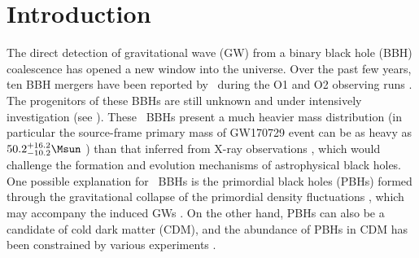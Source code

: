 \documentclass[twocolumn]{aastex631}
\begin{document}

\section{Introduction}
The direct detection of gravitational wave (GW) from a binary black hole (BBH)
coalescence \cite{Abbott:2016blz} has opened a new window into the universe.
Over the past few years, ten BBH mergers have been reported by \lvc\ during 
the O1 and O2 observing runs \cite{Abbott:2016blz,Abbott:2016nmj,%
TheLIGOScientific:2016pea,Abbott:2017vtc,%
Abbott:2017gyy,Abbott:2017oio,LIGOScientific:2018mvr}.
The progenitors of these BBHs are still unknown and under intensively investigation (see \eg \cite{Bird:2016dcv,Sasaki:2016jop,Chen:2018czv,%
Fishbach:2017dwv,Clesse:2016vqa,Antonini:2016gqe,%
Inayoshi:2017mrs,Ali-Haimoud:2017rtz,Perna:2019axr,Kavanagh:2018ggo,%
Rodriguez:2015oxa,Rodriguez:2016kxx,Park:2017zgj,%
Belczynski:2014iua,Belczynski:2016obo,Woosley:2016nnw,%
Rodriguez:2018rmd,Choksi:2018jnq,2010AIPC.1314..291D,deMink:2016vkw}).
These \lvc\ BBHs present a much heavier mass distribution (in particular the 
source-frame primary mass of GW170729 event can be as heavy as
$50.2^{+16.2}_{-10.2} \Msun$ \cite{LIGOScientific:2018mvr}) than that 
inferred from X-ray observations
\cite{Wiktorowicz:2013dua,Casares:2013tpa,Corral-Santana:2013uua,%
Corral-Santana:2015fud},
which would challenge the formation and evolution mechanisms of astrophysical
black holes. 
One possible explanation for \lvc\ BBHs is the primordial black holes (PBHs)
\cite{Bird:2016dcv,Sasaki:2016jop,Chen:2018czv}
formed through the gravitational collapse of the primordial density
fluctuations \cite{Hawking:1971ei,Carr:1974nx}, 
which may accompany the induced GWs
\cite{Yuan:2019udt,Yuan:2019wwo,Chen:2019xse,Yuan:2019fwv,Cai:2019bmk,Cai:2018dig,Cai:2019elf,DeLuca:2019ufz,Bartolo:2018rku,Bartolo:2018evs}.
On the other hand, PBHs can also be a candidate of cold dark matter (CDM),
and the abundance of PBHs in CDM has been constrained by various experiments
\cite{Carr:2009jm,Barnacka:2012bm,Graham:2015apa,Niikura:2017zjd,%
Griest:2013esa,Niikura:2019kqi,Tisserand:2006zx,Brandt:2016aco,Gaggero:2016dpq,%
Ali-Haimoud:2016mbv,Blum:2016cjs,Horowitz:2016lib,Chen:2016pud,%
Wang:2016ana,Abbott:2018oah,Magee:2018opb,Wang:2019kaf,Chen:2018rzo,Chen:2019irf,%
Yuan:2019udt,Chen:2019xse,Montero-Camacho:2019jte,Laha:2019ssq,Dasgupta:2019cae,Gow:2019pok}.
\end{document}
